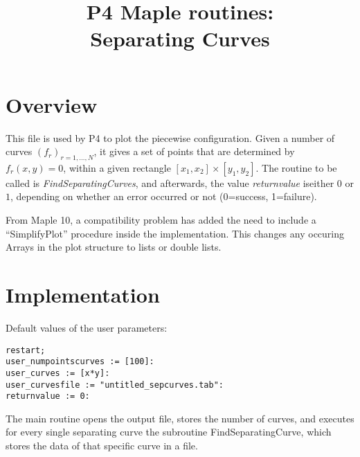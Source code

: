 \documentclass[a4paper,10pt]{article}
\title{P4 Maple routines:\\Separating Curves}
\author{}
\date{}
\begin{document}
\maketitle

\section{Overview}

This file is used by P4 to plot the piecewise configuration. Given a number of
curves $(f_r)_{r=1,\dots,N}$, it gives a set of points that are determined by
$f_r(x,y)=0$, within a given rectangle $[x_1,x_2]\times[y_1,y_2]$. The routine
to be called is \emph{FindSeparatingCurves}, and afterwards, the value
\emph{returnvalue} iseither $0$ or $1$, depending on whether an error occurred
or not (0=success, 1=failure).

From Maple 10, a compatibility problem has added the need to include a
``SimplifyPlot'' procedure inside the implementation. This changes any occuring
Arrays in the plot structure to lists or double lists.

\section{Implementation}

Default values of the user parameters:

\begin{lstlisting}[name=p4gcf]
restart;
user_numpointscurves := [100]:
user_curves := [x*y]:
user_curvesfile := "untitled_sepcurves.tab":
returnvalue := 0:
\end{lstlisting}

The main routine opens the output file, stores the number of curves, and
executes for every single separating curve the subroutine FindSeparatingCurve,
which stores the data of that specific curve in a file.
\end{document}
